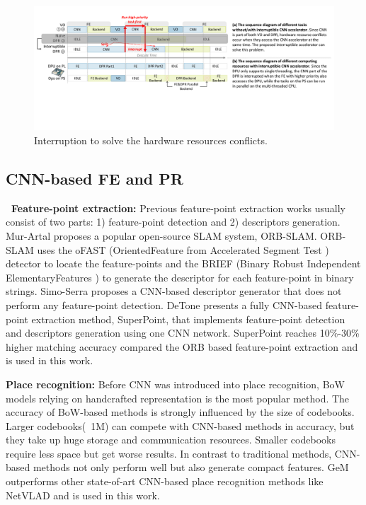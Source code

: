 
\label{sec:relate}


\begin{figure}[t]
	\centering
	\includegraphics[width=0.99\linewidth]{fig/interDPR.pdf}
    \caption{Interruption to solve the hardware resources conflicts.  
    }
	\label{fig:interDPR}
\end{figure}


\subsection{ CNN-based FE and PR }

\textbf{\quad \ Feature-point extraction:} Previous feature-point extraction works usually consist of two parts: 1) feature-point detection and 2) descriptors generation.
Mur-Artal \cite{Mur-Artal:2017281} proposes a popular open-source SLAM system, ORB-SLAM. ORB-SLAM uses the oFAST (OrientedFeature from Accelerated Segment Test \cite{biadgie2014feature}) detector to locate the feature-points and the BRIEF (Binary Robust Independent ElementaryFeatures \cite{calonder2010brief}) to generate the descriptor for each feature-point in binary strings. 
Simo-Serra \cite{simo2015discriminative} proposes a CNN-based descriptor generator that does not perform any feature-point detection. 
DeTone \cite{detone2018superpoint} presents a fully CNN-based feature-point extraction method, SuperPoint, that implements feature-point detection and descriptors generation using one CNN network. SuperPoint\cite{detone2018superpoint} reaches 10\%-30\% higher matching accuracy compared the ORB based feature-point extraction \cite{Mur-Artal:2017281} and is used in this work.

\textbf{Place recognition:} Before CNN was introduced into place recognition, BoW \cite{small_1} models relying on handcrafted representation is the most popular method. The accuracy of BoW-based methods is strongly influenced by the size of codebooks. Larger codebooks(~1M) \cite{large_1, large_2} can compete with CNN-based methods in accuracy, but they take up huge storage and communication resources. Smaller codebooks\cite{small_1, small_2} require less space but get worse results. In contrast to traditional methods, CNN-based methods not only perform well but also generate compact features. GeM \cite{radenovic2018fine} outperforms other state-of-art CNN-based place recognition methods like NetVLAD \cite{arandjelovic2016netvlad} and is used in this work.


